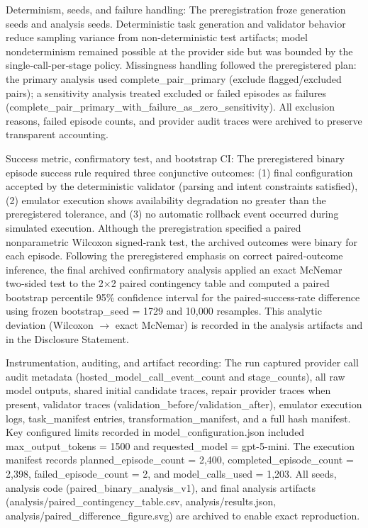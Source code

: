 \documentclass[conference]{IEEEtran}
\begin{document}
Determinism, seeds, and failure handling: The preregistration froze generation seeds and analysis seeds. Deterministic task generation and validator behavior reduce sampling variance from non‑deterministic test artifacts; model nondeterminism remained possible at the provider side but was bounded by the single‑call-per‑stage policy. Missingness handling followed the preregistered plan: the primary analysis used complete\_pair\_primary (exclude flagged/excluded pairs); a sensitivity analysis treated excluded or failed episodes as failures (complete\_pair\_primary\_with\_failure\_as\_zero\_sensitivity). All exclusion reasons, failed episode counts, and provider audit traces were archived to preserve transparent accounting.

Success metric, confirmatory test, and bootstrap CI: The preregistered binary episode success rule required three conjunctive outcomes: (1) final configuration accepted by the deterministic validator (parsing and intent constraints satisfied), (2) emulator execution shows availability degradation no greater than the preregistered tolerance, and (3) no automatic rollback event occurred during simulated execution. Although the preregistration specified a paired nonparametric Wilcoxon signed‑rank test, the archived outcomes were binary for each episode. Following the preregistered emphasis on correct paired‑outcome inference, the final archived confirmatory analysis applied an exact McNemar two‑sided test to the 2\ensuremath{\times}2 paired contingency table and computed a paired bootstrap percentile 95\% confidence interval for the paired‑success‑rate difference using frozen bootstrap\_seed = 1729 and 10,000 resamples. This analytic deviation (Wilcoxon \ensuremath{\rightarrow} exact McNemar) is recorded in the analysis artifacts and in the Disclosure Statement.

Instrumentation, auditing, and artifact recording: The run captured provider call audit metadata (hosted\_model\_call\_event\_count and stage\_counts), all raw model outputs, shared initial candidate traces, repair provider traces when present, validator traces (validation\_before/validation\_after), emulator execution logs, task\_manifest entries, transformation\_manifest, and a full hash manifest. Key configured limits recorded in model\_configuration.json included max\_output\_tokens = 1500 and requested\_model = gpt-5-mini. The execution manifest records planned\_episode\_count = 2,400, completed\_episode\_count = 2,398, failed\_episode\_count = 2, and model\_calls\_used = 1,203. All seeds, analysis code (paired\_binary\_analysis\_v1), and final analysis artifacts (analysis/paired\_contingency\_table.csv, analysis/results.json, analysis/paired\_difference\_figure.svg) are archived to enable exact reproduction.
\end{document}
